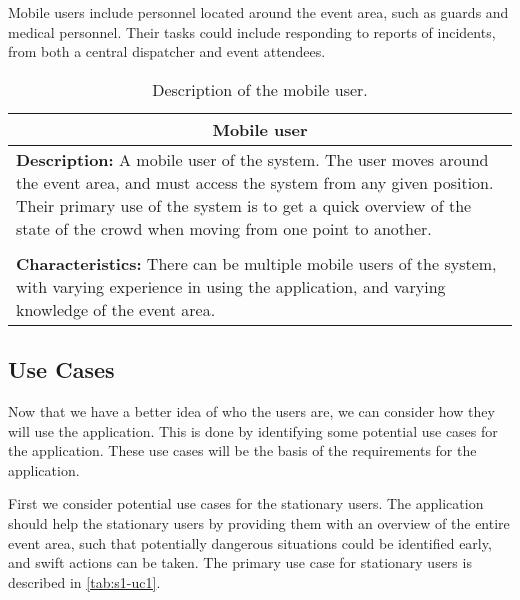 Mobile users include personnel located around the event area, such as guards and medical personnel. Their tasks could include responding to reports of incidents, from both a central dispatcher and event attendees.

\begin{table}[h!]
    \centering
    \begin{tabularx}{/4}{X}
        \toprule
        \multicolumn{1}{c}{\textbf{Mobile user}} \\ 
        \midrule
        \textbf{Description:} A mobile user of the system. The user moves around the event area, and must access the system from any given position. Their primary use of the system is to get a quick overview of the state of the crowd when moving from one point to another. \\
        \\
        \textbf{Characteristics:} There can be multiple mobile users of the system, with varying experience in using the application, and varying knowledge of the event area. \\
        \bottomrule
    \end{tabularx}
    \caption{Description of the mobile user.}
    \label{tab:mob_user}
\end{table}


\subsection{Use Cases} \label{ss:s1_uc}
Now that we have a better idea of who the users are, we can consider how they will use the application. This is done by identifying some potential use cases for the application. These use cases will be the basis of the requirements for the application.

First we consider potential use cases for the stationary users. The application should help the stationary users by providing them with an overview of the entire event area, such that potentially dangerous situations could be identified early, and swift actions can be taken. The primary use case for stationary users is described in \cref{tab:s1-uc1}.

